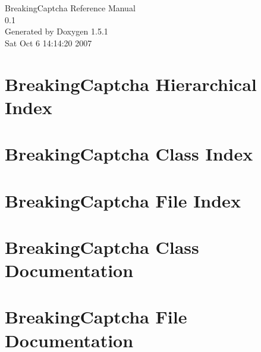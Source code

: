 \documentclass[a4paper]{book}
\begin{document}
\begin{titlepage}
\vspace*{7cm}
\begin{center}
{\Large Breaking\-Captcha Reference Manual\\[1ex]\large 0.1 }\\
\vspace*{1cm}
{\large Generated by Doxygen 1.5.1}\\
\vspace*{0.5cm}
{\small Sat Oct 6 14:14:20 2007}\\
\end{center}
\end{titlepage}
\clearemptydoublepage
{}
\tableofcontents
\clearemptydoublepage
{}
\chapter{Breaking\-Captcha Hierarchical Index}

\chapter{Breaking\-Captcha Class Index}

\chapter{Breaking\-Captcha File Index}

\chapter{Breaking\-Captcha Class Documentation}


\chapter{Breaking\-Captcha File Documentation}




\printindex
\end{document}
